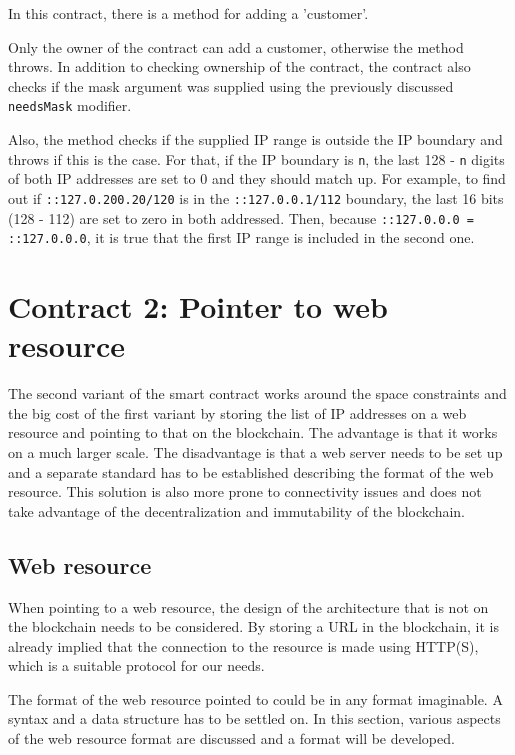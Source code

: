 In this contract, there is a method for adding a 'customer'.



Only the owner of the contract can add a customer, otherwise the method throws. In addition to checking ownership of the contract, the contract also checks if the mask argument was supplied using the previously discussed \texttt{needsMask} modifier.

Also, the method checks if the supplied IP range is outside the IP boundary and throws if this is the case. For that, if the IP boundary is \texttt{n}, the last 128 - \texttt{n} digits of both IP addresses are set to 0 and they should match up. For example, to find out if \texttt{::127.0.200.20/120} is in the \texttt{::127.0.0.1/112} boundary, the last 16 bits (128 - 112) are set to zero in both addressed. Then, because \texttt{::127.0.0.0 = ::127.0.0.0}, it is true that the first IP range is included in the second one.


\section{Contract 2: Pointer to web resource}
The second variant of the smart contract works around the space constraints and the big cost of the first variant by storing the list of IP addresses on a web resource and pointing to that on the blockchain. The advantage is that it works on a much larger scale. The disadvantage is that a web server needs to be set up and a separate standard has to be established describing the format of the web resource. This solution is also more prone to connectivity issues and does not take advantage of the decentralization and immutability of the blockchain.

\subsection{Web resource}
When pointing to a web resource, the design of the architecture that is not on the blockchain needs to be considered. By storing a URL in the blockchain, it is already implied that the connection to the resource is made using HTTP(S), which is a suitable protocol for our needs.

The format of the web resource pointed to could be in any format imaginable. A syntax and a data structure has to be settled on. In this section, various aspects of the web resource format are discussed and a format will be developed.

